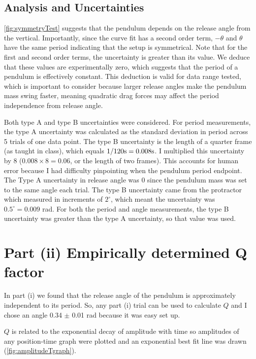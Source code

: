 \documentclass[notitlepage, twocolumn, 12pt]{article}
\begin{document}
    \subsection*{\textcolor{WildStrawberry}{Analysis and Uncertainties}}
    \color{WildStrawberry}
    \cref{fig:symmetryTest} suggests that the pendulum depends on the release angle from the vertical. Importantly, since the curve fit has a second order term, $-\theta$ and $\theta$ have the same period indicating that the setup is symmetrical. Note that for the first and second order terms, the uncertainty is greater than its value. We deduce that these values are experimentally zero, which suggests that the period of a pendulum is effectively constant. This deduction is valid for data range tested, which is important to consider because larger release angles make the pendulum mass swing faster, meaning quadratic drag forces may affect the period independence from release angle.

    Both type A and type B uncertainties were considered. For period measurements, the type A uncertainty was calculated as the standard deviation in period across 5 trials of one data point. The type B uncertainty is the length of a quarter frame (as taught in class), which equals $1/120 \rm{s} = 0.008 \rm{s}$. I multiplied this uncertainty by 8 ($0.008 \times 8 = 0.06$, or the length of two frames). This accounts for human error because I had difficulty pinpointing when the pendulum period endpoint. 
    The Type A uncertainty in release angle was 0 since the pendulum mass was set to the same angle each trial. The type B uncertainty came from the protractor which measured in increments of $2^\circ$, which meant the uncertainty was $0.5^\circ = 0.009$ rad. 
    For both the period and angle measurements, the type B uncertainty was greater than the type A uncertainty, so that value was used. 

    \section*{Part (ii) Empirically determined Q factor}
    \textcolor{WildStrawberry}{In part (i) we found that the release angle of the pendulum is approximately independent to its period. So, any part (i) trial can be used to calculate $Q$ and I chose an angle 0.34 $\pm$ 0.01 rad because it was easy set up.}

    $Q$ is related to the exponential decay of amplitude with time so amplitudes of any position-time graph were plotted and an exponential best fit line was drawn (\cref{fig:amplitudeTgraph}). 
\end{document}
